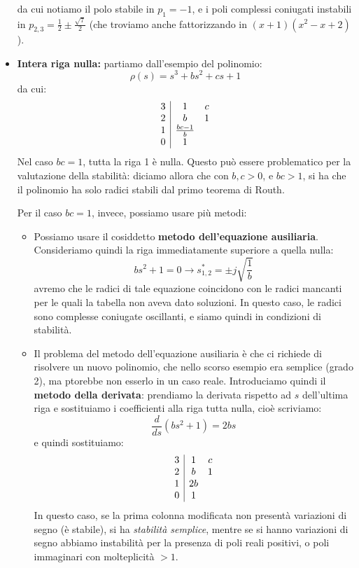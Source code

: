 \documentclass[a4paper,11pt]{article}
\begin{document}
\begin{itemize}
\par\medskip

da cui notiamo il polo stabile in $p_1 = -1$, e i poli complessi coniugati instabili in $p_{2,3} = \frac{1}{2} \pm \frac{\sqrt{7}}{2}$ (che troviamo anche fattorizzando in $(x + 1) (x^2 - x + 2)$).

\item \textbf{Intera riga nulla:} partiamo dall'esempio del polinomio:
$$
\rho(s) = s^3 + bs^2 + cs + 1
$$
da cui:
$$
\begin{array}{c | c c}
	3 & 1 & c \\
	2 & b & 1 \\
	1 & \frac{bc - 1}{b} \\
	0 & 1
\end{array}
$$
Nel caso $bc = 1$, tutta la riga 1 è nulla.
Questo può essere problematico per la valutazione della stabilità: diciamo allora che con $b, c > 0$, e $bc > 1$, si ha che il polinomio ha solo radici stabili dal primo teorema di Routh.

Per il caso $bc = 1$, invece, possiamo usare più metodi:
\begin{itemize}
	\item Possiamo usare il cosiddetto \textbf{metodo dell'equazione ausiliaria}.
Consideriamo quindi la riga immediatamente superiore a quella nulla:
$$
bs^2 + 1 = 0 \rightarrow s^*_{1, 2} = \pm j \sqrt{ \frac{1}{b} }
$$
avremo che le radici di tale equazione coincidono con le radici mancanti per le quali la tabella non aveva dato soluzioni.
In questo caso, le radici sono complesse coniugate oscillanti, e siamo quindi in condizioni di stabilità.

	\item Il problema del metodo dell'equazione ausiliaria è che ci richiede di risolvere un nuovo polinomio, che nello scorso esempio era semplice (grado 2), ma ptorebbe non esserlo in un caso reale.
Introduciamo quindi il \textbf{metodo della derivata}: prendiamo la derivata rispetto ad $s$ dell'ultima riga e sostituiamo i coefficienti alla riga tutta nulla, cioè scriviamo:
$$
\frac{d}{ds} \left( bs^2 + 1 \right) = 2bs
$$
e quindi sostituiamo:
$$
\begin{array}{c | c c}
	3 & 1 & c \\
	2 & b & 1 \\
	1 & 2b \\
	0 & 1
\end{array}
$$
In questo caso, se la prima colonna modificata non presentà variazioni di segno (è stabile), si ha \textit{stabilità semplice}, mentre se si hanno variazioni di segno abbiamo instabilità per la presenza di poli reali positivi, o poli immaginari con molteplicità $> 1$.


\end{itemize}
\end{itemize}
\end{document}

